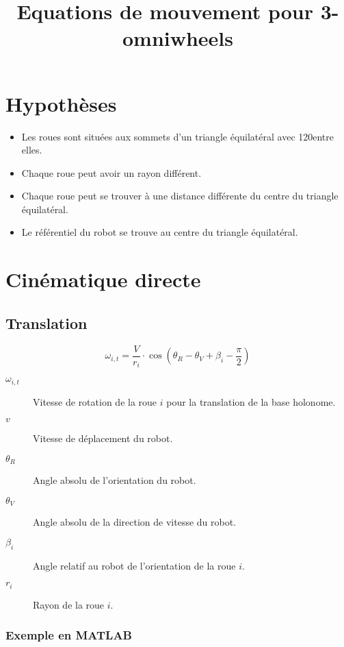 \documentclass[a4paper]{paper}
\title{Equations de mouvement pour 3-omniwheels}
\begin{document}
\maketitle
\section{Hypothèses}
\begin{itemize}
    \item Les roues sont situées aux sommets d'un triangle équilatéral avec 120\degre entre elles.
    \item Chaque roue peut avoir un rayon différent.
    \item Chaque roue peut se trouver à une distance différente du centre du triangle équilatéral.
    \item Le référentiel du robot se trouve au centre du triangle équilatéral.
\end{itemize}

\section{Cinématique directe}

\subsection{Translation}

\begin{equation}
    \omega_{i,t} = \frac{V}{r_i} \cdot \cos\left( \theta_R - \theta_V + \beta_i - \frac{\pi}{2} \right)
    \label{eqn:forward-translation}
\end{equation}

\begin{description}
    \item[$\omega_{i,t}$] Vitesse de rotation de la roue $i$ pour la translation de la base holonome.
    \item[$v$] Vitesse de déplacement du robot.
    \item[$\theta_R$] Angle absolu de l'orientation du robot.
    \item[$\theta_V$] Angle absolu de la direction de vitesse du robot.
    \item[$\beta_i$] Angle relatif au robot de l'orientation de la roue $i$.
    \item[$r_i$] Rayon de la roue $i$.
\end{description}
\subsubsection{Exemple en MATLAB}
\end{document}
